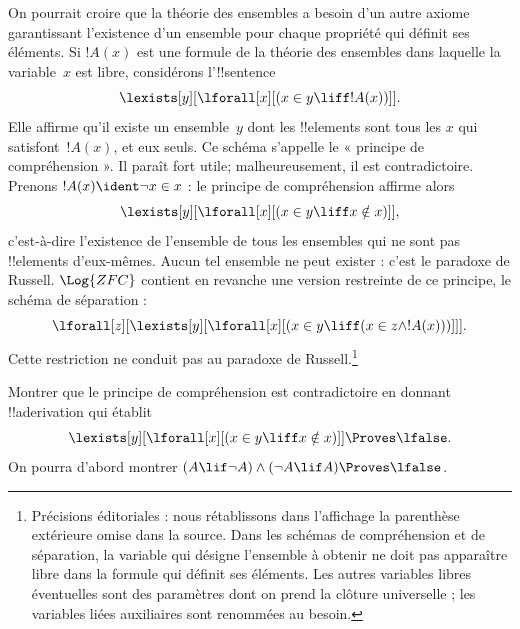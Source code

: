\documentclass[../../../include/open-logic-section]{subfiles}
\begin{document}
On pourrait croire que la théorie des ensembles a besoin d'un autre
axiome garantissant l'existence d'un ensemble pour chaque propriété
qui définit ses éléments. Si $!A(x)$ est une formule de la théorie
des ensembles dans laquelle la variable~$x$ est libre, considérons
l'!!{sentence}
\[
\lexists[y][\lforall[x][(x \in y \liff !A(x))]].
\]
Elle affirme qu'il existe un ensemble~$y$ dont les !!{element}s
sont tous les $x$ qui satisfont~$!A(x)$, et eux seuls. Ce schéma
s'appelle le « principe de compréhension ». Il paraît fort utile;
malheureusement, il est contradictoire. Prenons
$!A(x) \ident \lnot x \in x$ : le principe de compréhension affirme
alors
\[
\lexists[y][\lforall[x][(x \in y \liff x \notin x)]],
\]
c'est-à-dire l'existence de l'ensemble de tous les ensembles qui ne
sont pas !!{element}s d'eux-mêmes. Aucun tel ensemble ne peut
exister : c'est le paradoxe de Russell. $\Log{ZFC}$ contient en
revanche une version restreinte de ce principe, le schéma de
séparation :
\[
\lforall[z][\lexists[y][\lforall[x][(x \in y \liff (x \in z \land
      !A(x)))]]].
\]
Cette restriction ne conduit pas au paradoxe de Russell.\footnote{Précisions éditoriales : nous rétablissons dans l'affichage la parenthèse extérieure omise dans la source. Dans les schémas de compréhension et de séparation, la variable qui désigne l'ensemble à obtenir ne doit pas apparaître libre dans la formule qui définit ses éléments. Les autres variables libres éventuelles sont des paramètres dont on prend la clôture universelle ; les variables liées auxiliaires sont renommées au besoin.}

\begin{prob}
Montrer que le principe de compréhension est contradictoire en
donnant !!a{derivation} qui établit
\[
\lexists[y][\lforall[x][(x \in y \liff x \notin x)]] \Proves \lfalse.
\]
On pourra d'abord montrer
$(A \lif \lnot A) \land (\lnot A \lif A)
\Proves \lfalse$.
\end{prob}
\end{document}
